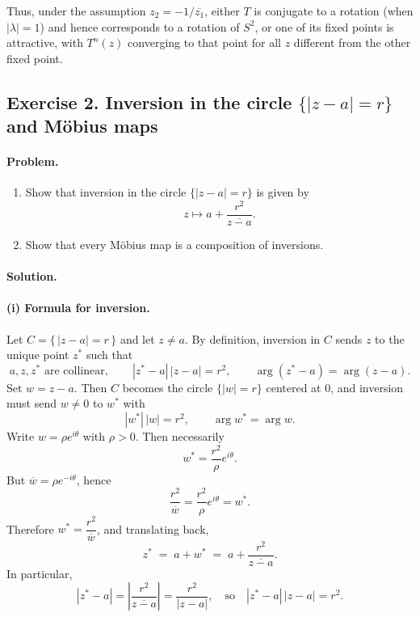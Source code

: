 \documentclass[12pt,a4paper]{article}
\theoremstyle{plain}
\theoremstyle{definition}      %
\begin{document}
Thus, under the assumption $z_{2}=-1/\overline{z_{1}}$, either $T$ is
conjugate to a rotation (when $|\lambda|=1$) and hence corresponds to a
rotation of $S^{2}$, or one of its fixed points is attractive, with
$T^{n}(z)$ converging to that point for all $z$ different from the other
fixed point.



\subsection*{\textbf{Exercise 2. Inversion in the circle $\{|z-a|=r\}$ and Möbius maps}}

\paragraph{\textbf{Problem.}}
\begin{enumerate}
	\item Show that inversion in the circle $\{|z-a|=r\}$ is given by
	\[
	z \longmapsto a+\frac{r^{2}}{\overline{z-a}}.
	\]
	\item Show that every Möbius map is a composition of inversions.
\end{enumerate}

\paragraph{\textbf{Solution.}}

\paragraph{\textbf{(i) Formula for inversion.}}
Let $C=\{\,|z-a|=r\,\}$ and let $z\neq a$. By definition, inversion in $C$ sends $z$ to the unique point $z^{*}$ such that
\[
a,z,z^{*} \text{ are collinear},\qquad |z^{*}-a|\,|z-a|=r^2,
\qquad \arg(z^{*}-a)=\arg(z-a).
\]
Set $w=z-a$. Then $C$ becomes the circle $\{|w|=r\}$ centered at $0$, and inversion must send $w\neq 0$ to $w^{*}$ with
\[
|w^{*}|\,|w|=r^2,\qquad \arg w^{*}=\arg w.
\]
Write $w=\rho e^{i\theta}$ with $\rho>0$. Then necessarily
\[
w^{*}=\frac{r^2}{\rho}e^{i\theta}.
\]
But $\overline{w}=\rho e^{-i\theta}$, hence
\[
\frac{r^2}{\overline{w}}=\frac{r^2}{\rho}e^{i\theta}=w^{*}.
\]
Therefore $w^{*}=\dfrac{r^2}{\overline{w}}$, and translating back,
\[
z^{*} \;=\; a+w^{*} \;=\; a+\frac{r^2}{\overline{z-a}}.
\]
In particular,
\[
|z^{*}-a|=\left|\frac{r^2}{\overline{z-a}}\right|=\frac{r^2}{|z-a|},
\quad\text{so}\quad
|z^{*}-a|\,|z-a|=r^2.
\]
\end{document}
